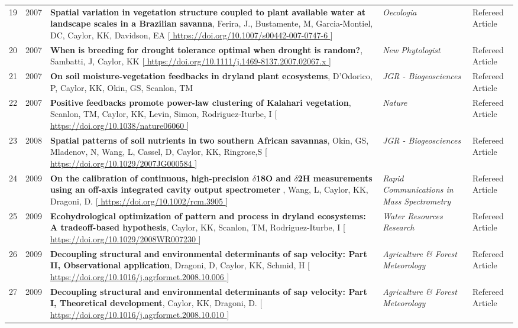 \begin{supertabular}{lcp{8.25cm}p{4.75cm}p{1.75cm}}
19 & 2007 & {\bf Spatial variation in vegetation structure coupled to plant available water at landscape scales in a Brazilian savanna}, Ferira, J., Bustamente, M, Garcia-Montiel, DC, Caylor, KK, Davidson, EA [\url{ https://doi.org/10.1007/s00442-007-0747-6 }] & \emph{ Oecologia } & Refereed Article\\
20 & 2007 & {\bf When is breeding for drought tolerance optimal when drought is random?}, Sambatti, J, Caylor, KK [\url{ https://doi.org/10.1111/j.1469-8137.2007.02067.x }] & \emph{ New Phytologist } & Refereed Article\\
21 & 2007 & {\bf On soil moisture-vegetation feedbacks in dryland plant ecosystems}, D'Odorico, P, Caylor, KK, Okin, GS, Scanlon, TM  & \emph{ JGR - Biogeosciences } & Refereed Article\\
22 & 2007 & {\bf Positive feedbacks promote power-law clustering of Kalahari vegetation}, Scanlon, TM, Caylor, KK, Levin, Simon, Rodriguez-Iturbe, I [\url{ https://doi.org/10.1038/nature06060 }] & \emph{ Nature } & Refereed Article\\
23 & 2008 & {\bf Spatial patterns of soil nutrients in two southern African savannas}, Okin, GS, Mladenov, N, Wang, L, Cassel, D, Caylor, KK, Ringrose,S [\url{ https://doi.org/10.1029/2007JG000584 }] & \emph{ JGR - Biogeosciences } & Refereed Article\\
24 & 2009 & {\bf On the calibration of continuous, high-precision $\delta$18O and $\delta$2H measurements using an off-axis integrated cavity output spectrometer }, Wang, L, Caylor, KK, Dragoni, D. [\url{ https://doi.org/10.1002/rcm.3905 }] & \emph{ Rapid Communications in Mass Spectrometry } & Refereed Article\\
25 & 2009 & {\bf Ecohydrological optimization of pattern and process in dryland ecosystems: A tradeoff-based hypothesis}, Caylor, KK, Scanlon, TM, Rodriguez-Iturbe, I [\url{ https://doi.org/10.1029/2008WR007230 }] & \emph{ Water Resources Research } & Refereed Article\\
26 & 2009 & {\bf Decoupling structural and environmental determinants of sap velocity: Part II, Observational application}, Dragoni, D, Caylor, KK, Schmid, H [\url{ https://doi.org/10.1016/j.agrformet.2008.10.006 }] & \emph{ Agriculture \& Forest Meteorology } & Refereed Article\\
27 & 2009 & {\bf Decoupling structural and environmental determinants of sap velocity: Part I, Theoretical development}, Caylor, KK, Dragoni, D. [\url{ https://doi.org/10.1016/j.agrformet.2008.10.010 }] & \emph{ Agriculture \& Forest Meteorology } & Refereed Article\\

\end{supertabular}
